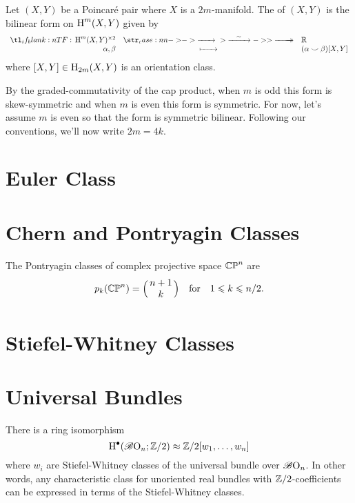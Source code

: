\begin{definition}\label{defn:intersection-form}
	Let $(X,Y)$ be a Poincar\'e pair where $X$ is a $2m$-manifold. The  of $(X,Y)$ is the bilinear form on $\operatorname{H}^{m}(X,Y)$ given by
	\[
		\lkxfunc{}{\H^{m}(X,Y)^{\times 2}}{\R}{\alpha, \beta}{(\alpha\smile\beta)[X,Y]}
	\]
	where $[X,Y]\in \operatorname{H}_{2m}(X,Y)$ is an orientation class.
\end{definition}
By the graded-commutativity of the cap product, when $m$ is odd this form is skew-symmetric and when $m$ is even this form is symmetric. For now, let's assume $m$ is even so that the form is symmetric bilinear. Following our conventions, we'll now write $2m=4k$. 


\section{Euler Class}\label{sec:euler_class}

\section{Chern and Pontryagin Classes}

\begin{proposition}\label{prop:pontryagin_classes_of_CPn}
  The Pontryagin classes of complex projective space $\mathbb{CP}^n$ are
  \[
    p_k(\CP^n) = \binom{n+1}{k}\quad\textrm{for}\quad 1\leq k \leq n/2.
  \]
\end{proposition}

\section{Stiefel-Whitney Classes}\label{sec:stiefel-whitney_classes}

\section{Universal Bundles}\label{sec:universal_bundles}

\cite{milnorstasheff1974characteristic}
\cite{botttu1982differential}

\begin{theorem}\label{thm:cohomology_of_BO}
  There is a ring isomorphism
  \[
    \operatorname{H}^\bullet(\mathscr{B}{\operatorname{O}}_n; \mathbb{Z}/2) \approx \mathbb{Z}/2[w_1,\ldots, w_n]
  \]
  where $w_i$ are Stiefel-Whitney classes of the universal bundle over $\mathscr{B}{\operatorname{O}}_n$. In other words, any characteristic class for unoriented real bundles with $\mathbb{Z}/2$-coefficients can be expressed in terms of the Stiefel-Whitney classes.
\end{theorem}

